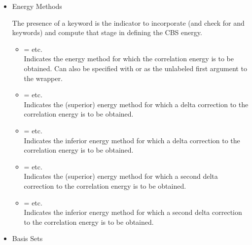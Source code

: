 \begin{itemize}
\item Energy Methods

The presence of a  keyword is the indicator to incorporate (and check for
 and  keywords) and compute that stage in defining the CBS energy.
\begin{itemize}
\item[]  =  \textbar\;  \textbar\; etc. \\
Indicates the energy method for which the correlation energy is to be obtained. Can also be specified with 
or as the unlabeled first argument to the wrapper.
\item[]  =  \textbar\;  \textbar\; etc. \\
Indicates the (superior) energy method for which a delta correction to the correlation energy is to be obtained.
\item[]  = \textit{} \textbar\;  \textbar\; etc. \\
Indicates the inferior energy method for which a delta correction to the correlation energy is to be obtained.
\item[]  =  \textbar\;  \textbar\; etc. \\
Indicates the (superior) energy method for which a second delta correction to the correlation energy is to be obtained.
\item[]  = \textit{} \textbar\;  \textbar\; etc. \\
Indicates the inferior energy method for which a second delta correction to the correlation energy is to be obtained.
\end{itemize}

\item Basis Sets


\end{itemize}
